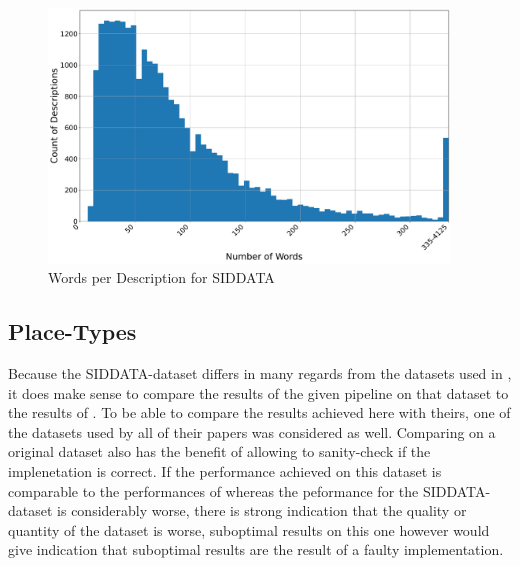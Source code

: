 \begin{figure}[H]
	\centering
	\includegraphics[width=0.95\textwidth]{graphics/dataset_new/words_per_desc.pdf}
	\caption{Words per Description for SIDDATA}
	\label{fig:sid_wordsperdesc}
\end{figure}



\subsection{Place-Types}
\label{sec:dataset_placetypes}

Because the SIDDATA-dataset differs in many regards from the datasets used in \mainalgos, %
it does make sense to compare the results of the given pipeline on that dataset to the results of \mainalgos. To be able to compare the results achieved here with theirs, one of the datasets used by all of their papers was considered as well. Comparing on a original dataset also has the benefit of allowing to sanity-check if the implenetation is correct. If the performance achieved on this dataset is comparable to the performances of \mainalgos whereas the peformance for the SIDDATA-dataset is considerably worse, there is strong indication that the quality or quantity of the dataset is worse, suboptimal results on this one however would give indication that suboptimal results are the result of a faulty implementation.


